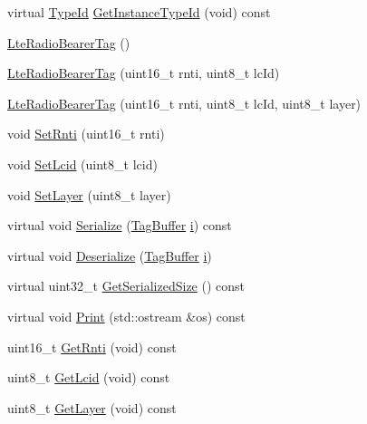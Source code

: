 \begin{DoxyCompactItemize}
\item 
virtual \hyperlink{classns3_1_1TypeId}{Type\+Id} \hyperlink{classns3_1_1LteRadioBearerTag_ae4dfe8e191e750c79dab43200a454813}{Get\+Instance\+Type\+Id} (void) const 
\item 
\hyperlink{classns3_1_1LteRadioBearerTag_a99774980b22cfb821264fc39d3cf8326}{Lte\+Radio\+Bearer\+Tag} ()
\item 
\hyperlink{classns3_1_1LteRadioBearerTag_a97405d89cb418ab72501eab45a8d4464}{Lte\+Radio\+Bearer\+Tag} (uint16\+\_\+t rnti, uint8\+\_\+t lc\+Id)
\item 
\hyperlink{classns3_1_1LteRadioBearerTag_a8bba95d0c866f85892e8582cdf8c5aa9}{Lte\+Radio\+Bearer\+Tag} (uint16\+\_\+t rnti, uint8\+\_\+t lc\+Id, uint8\+\_\+t layer)
\item 
void \hyperlink{classns3_1_1LteRadioBearerTag_aaa97c0a5ea3332668b334dbc2317a28d}{Set\+Rnti} (uint16\+\_\+t rnti)
\item 
void \hyperlink{classns3_1_1LteRadioBearerTag_abb3d6d7a99170a68b2144741a9874141}{Set\+Lcid} (uint8\+\_\+t lcid)
\item 
void \hyperlink{classns3_1_1LteRadioBearerTag_a14bae062a10414466a8ba08af219c6d9}{Set\+Layer} (uint8\+\_\+t layer)
\item 
virtual void \hyperlink{classns3_1_1LteRadioBearerTag_ac5ea75bf78282711ff4b2dd183aaca44}{Serialize} (\hyperlink{classns3_1_1TagBuffer}{Tag\+Buffer} \hyperlink{lte__uplink__power__control_8m_a6f6ccfcf58b31cb6412107d9d5281426}{i}) const 
\item 
virtual void \hyperlink{classns3_1_1LteRadioBearerTag_a607a0ef05f2e897de3fe1c176f7a40ff}{Deserialize} (\hyperlink{classns3_1_1TagBuffer}{Tag\+Buffer} \hyperlink{lte__uplink__power__control_8m_a6f6ccfcf58b31cb6412107d9d5281426}{i})
\item 
virtual uint32\+\_\+t \hyperlink{classns3_1_1LteRadioBearerTag_af40891263259326a6e536498b536a03f}{Get\+Serialized\+Size} () const 
\item 
virtual void \hyperlink{classns3_1_1LteRadioBearerTag_ade273c65ca376b5347cc6272c12381f5}{Print} (std\+::ostream \&os) const 
\item 
uint16\+\_\+t \hyperlink{classns3_1_1LteRadioBearerTag_a53236fec6f903bc171a0a68645fc822d}{Get\+Rnti} (void) const 
\item 
uint8\+\_\+t \hyperlink{classns3_1_1LteRadioBearerTag_a225315b47fa02f5204563c92ccea8cd5}{Get\+Lcid} (void) const 
\item 
uint8\+\_\+t \hyperlink{classns3_1_1LteRadioBearerTag_ae344fc51d1b3e2954b5244c06f924075}{Get\+Layer} (void) const 
\end{DoxyCompactItemize}
